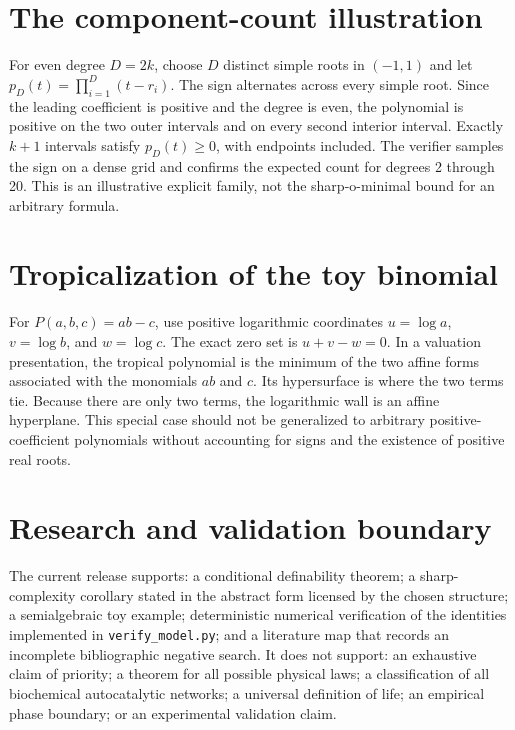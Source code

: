 \documentclass[11pt,a4paper]{article}
\theoremstyle{definition}
\theoremstyle{remark}
\begin{document}
\section{The component-count illustration}
For even degree \(D=2k\), choose \(D\) distinct simple roots in \((-1,1)\) and let \(p_D(t)=\prod_{i=1}^{D}(t-r_i)\). The sign alternates across every simple root. Since the leading coefficient is positive and the degree is even, the polynomial is positive on the two outer intervals and on every second interior interval. Exactly \(k+1\) intervals satisfy \(p_D(t)\geq0\), with endpoints included. The verifier samples the sign on a dense grid and confirms the expected count for degrees 2 through 20. This is an illustrative explicit family, not the sharp-o-minimal bound for an arbitrary formula.

\section{Tropicalization of the toy binomial}
For \(P(a,b,c)=ab-c\), use positive logarithmic coordinates \(u=\log a\), \(v=\log b\), and \(w=\log c\). The exact zero set is \(u+v-w=0\). In a valuation presentation, the tropical polynomial is the minimum of the two affine forms associated with the monomials \(ab\) and \(c\). Its hypersurface is where the two terms tie. Because there are only two terms, the logarithmic wall is an affine hyperplane. This special case should not be generalized to arbitrary positive-coefficient polynomials without accounting for signs and the existence of positive real roots.

\section{Research and validation boundary}
The current release supports: a conditional definability theorem; a sharp-complexity corollary stated in the abstract form licensed by the chosen structure; a semialgebraic toy example; deterministic numerical verification of the identities implemented in \texttt{verify\_model.py}; and a literature map that records an incomplete bibliographic negative search. It does not support: an exhaustive claim of priority; a theorem for all possible physical laws; a classification of all biochemical autocatalytic networks; a universal definition of life; an empirical phase boundary; or an experimental validation claim.



\end{document}
